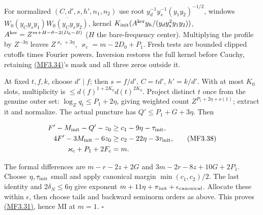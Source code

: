 \hypertarget{mf:eq:B3.37}{}

\label{mf:eq:B3.37}

\par\noindent\resizebox{\linewidth}{!}{\begin{minipage}{\dimexpr\linewidth+74.35098pt\relax}\[
N_c=D_0-B-v,\quad V_c=\theta+v,\quad F_c=D_0-P_1,
\quad N'=\max(0,N_c),\quad0\le\delta_N=N'-N_c\le3\eta,
\quad F'=F_c+\delta_N.
\qquad\text{(MF3.37)}
\]\end{minipage}}\par

For normalized \((C,d',s,h',n_1,n_2)\) use root \(y_d^{-1}y_s^{-1}(y_1y_2)^{-1/2}\), windows \(W_0(y_Cy_sy_1)\overline{W_0(y_Cy_sy_2)}\), kernel \(K_{\rm init}(A^{\rm ker}y_h/(y_dy_s^2y_1y_2))\), \(A^{\rm ker}=Z^{m+H-\theta-2(D_0-B)}\) (\(H\) the bare-frequency center). Multiplying the profile by \(Z^{-3\eta}\) leaves \(Z^{\varkappa_c+3\eta}\), \(\varkappa_c=m-2D_0+P_1\). Fresh tests are bounded clipped cutoffs times Fourier powers. Inversion restores the full kernel before Cauchy, retaining \protect\hyperlink{mf:eq:B3.34}{(MF3.34)}'s mask and all three zeros outside it.

At fixed \(t,f,k\), choose \(d'\mid f\); then \(s=f/d'\), \(C=td'\), \(h'=k/d'\). With at most \(K_0\) slots, multiplicity is \(\le d(f)^{1+2K_0}d(t)^{2K_0}\). Project distinct \(t\) once from the genuine outer set: \(\log_Zq_t\le P_1+2\eta\), giving weighted count \(Z^{P_1+2\eta+o(1)}\); extract it and normalize. The actual puncture has \(Q'\le P_1+G+3\eta\). Then

\hypertarget{mf:eq:B3.38}{}

\label{mf:eq:B3.38}

\[
\begin{aligned}
F'-M_{\rm init}-Q'-z_0&\ge c_1-9\eta-\tau_{\rm init},\\
4F'-3M_{\rm init}-6z_0&\ge c_2-22\eta-3\tau_{\rm init},\\
\varkappa_c+P_1+2F_c&=m.
\end{aligned}\qquad\text{(MF3.38)}
\]

The formal differences are \(m-r-2z+2G\) and \(3m-2r-8z+10G+2P_1\). Choose \(\eta,\tau_{\rm init}\) small and apply canonical margin \(\min(c_1,c_2)/2\). The last identity and \(2\delta_N\le6\eta\) give exponent \(m+11\eta+\pi_{\rm init}+\epsilon_{\rm canonical}\). Allocate these within \(\epsilon\), then choose tails and backward seminorm orders as above. This proves \protect\hyperlink{mf:eq:B3.31}{(MF3.31)}, hence MI at \(m=1\). \(\square\)

